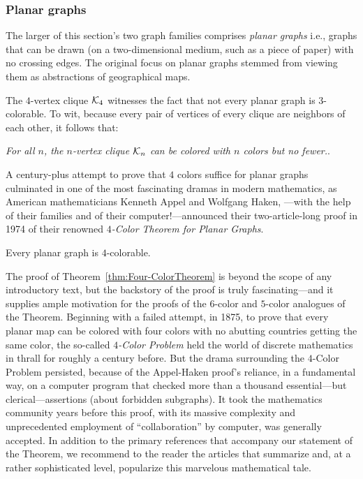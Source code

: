 \subsubsection{Planar graphs}
\label{sec:planar-graphs}

The larger of this section's two graph families comprises {\it planar
  graphs}   i.e., graphs
that can be drawn (on a two-dimensional medium, such as a piece of
paper) with no crossing edges.  The original focus on planar graphs
stemmed from viewing them as abstractions of geographical maps.

The $4$-vertex clique $\mbox{$\cal K$}_4$ witnesses the fact that not every planar
graph is $3$-colorable.  To wit, because every pair of vertices of every
clique are neighbors of each other, it follows that:

\smallskip

{\em For all $n$, the $n$-vertex clique $\mbox{$\cal K$}_n$ can be colored with $n$
  colors but no fewer.}.

\smallskip

\noindent
A century-plus attempt to prove that $4$ colors suffice for planar
graphs culminated in one of the most fascinating dramas in modern
mathematics, as American mathematicians Kenneth Appel 
and Wolfgang Haken, ---with the help of their
families and of their computer!---announced their two-article-long
proof in 1974 of their renowned {\it $4$-Color Theorem for Planar
  Graphs}.  

\begin{theorem}
\label{thm:Four-ColorTheorem}
Every planar graph is $4$-colorable.
\end{theorem}

The proof of Theorem~\ref{thm:Four-ColorTheorem} is beyond the scope
of any introductory text, but the backstory of the proof is truly
fascinating---and it supplies ample motivation for the proofs of the
$6$-color and $5$-color analogues of the Theorem.  Beginning with a
failed attempt, in 1875, to prove that every planar map can be colored
with four colors with no abutting countries getting the same color,
the so-called {\it $4$-Color Problem}
held the world of discrete mathematics in thrall for roughly a century
before. But the drama surrounding the $4$-Color Problem persisted,
because of the Appel-Haken proof's reliance, in a fundamental way, on
a computer program that checked more than a thousand essential---but
clerical---assertions (about forbidden subgraphs).  It took the
mathematics community years before this proof, with its massive
complexity and unprecedented employment of ``collaboration'' by
computer, was generally accepted.  In addition to the primary
references \cite{AppelH77a,AppelH77b} that accompany our statement of
the Theorem, we recommend to the reader the articles
\cite{AppelH77c,AppelH89} that summarize and, at a rather
sophisticated level, popularize this marvelous mathematical tale.

